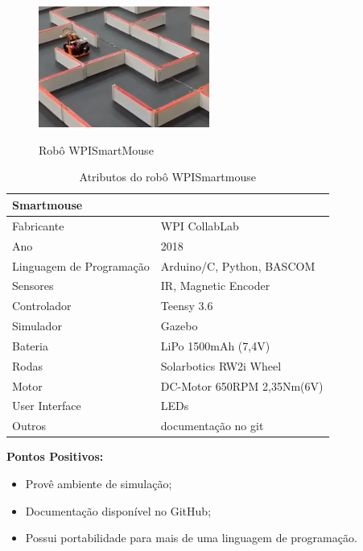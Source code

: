 \begin{figure}[H]
	\centering
	\caption{Robô WPISmartMouse}
	\includegraphics[width=0.5\textwidth]
	{Figures/WPISmartMouse_model.png}
	\label{fig:WPISmartMouse_model}
\end{figure}

\begin{table}[H]
	\centering
	\caption{Atributos do robô WPISmartmouse}
	\begin{tabular}{|l|l|}
		\hline
		\multicolumn{2}{|l|}{\textbf{Smartmouse}} \\ \hline
		Fabricante & WPI CollabLab \\ \hline
		Ano & 2018 \\ \hline
		Linguagem de Programação & Arduino/C, Python, BASCOM \\ \hline
		Sensores & IR, Magnetic Encoder \\ \hline
		Controlador & Teensy 3.6 \\ \hline
		Simulador & Gazebo \\ \hline
		Bateria & LiPo 1500mAh (7,4V) \\ \hline
		Rodas & Solarbotics RW2i Wheel \\ \hline
		Motor & DC-Motor 650RPM 2,35Nm(6V) \\ \hline
		User Interface & LEDs \\ \hline
		Outros & documentação no git \\ \hline
	\end{tabular}
	\label{tab:Smartmouse}
\end{table}

\textbf{Pontos Positivos:}
\begin{itemize}
	\item Provê ambiente de simulação;
	\item Documentação disponível no GitHub;
	\item Possui portabilidade para mais de uma linguagem de programação.
\end{itemize}

